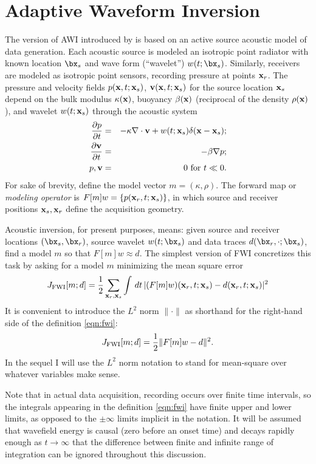 \section{Adaptive Waveform Inversion}

The version of AWI introduced by \cite{Warner:16} is based on an
active source acoustic model of data generation. Each acoustic source
is modeled an isotropic point radiator with known location $\bx_s$ and
wave form (``wavelet'') $w(t;\bx_s)$. Similarly, receivers are modeled
as isotropic point sensors, recording pressure at points ${\bf x}_r$. The pressure and velocity fields $p({\bf x},t;{\bf x}_s)$, ${\bf v}({\bf x},t;{\bf x}_s)$ for the source location ${\bf x}_s$ depend on the bulk modulus $\kappa({\bf x})$, buoyancy $\beta({\bf x})$ (reciprocal of the density $\rho({\bf x})$), and wavelet $w(t;{\bf x}_s)$ through the acoustic system
\begin{eqnarray}
  \label{eqn:awe}
 \frac{\partial p}{\partial t} & = &- \kappa \nabla \cdot {\bf v} +
w(t;{\bf x}_s) \delta({\bf x}-{\bf x}_s); \nonumber \\
\frac{\partial {\bf v}}{\partial t} & = & - \beta \nabla p; \\ 
p, {\bf v} & = & 0 \mbox{ for }  t \ll 0.
\end{eqnarray}
For sake of brevity, define the model vector $m=(\kappa,\rho)$. The forward map or {\em modeling operator} is $F[m]w = \{p({\bf x}_r,t;{\bf x}_s)\}$, in which source and receiver positions ${\bf x}_s, {\bf x}_r$ define the acquisition geometry.

Acoustic inversion, for present purposes, means: given source and receiver locations $(\bx_s,\bx_r)$, source wavelet
$w(t;\bx_s)$ and data traces $d(\bx_r,\cdot;\bx_s)$, find a model $m$
so that $F[m]w \approx d$. The
simplest version of FWI concretizes this task by asking for a model
$m$ minimizing the mean square error
\begin{equation}
  \label{eqn:fwi}
  J_{\rm FWI}[m;d] =\frac{1}{2} \sum_{{\bf x}_r,{\bf x}_s} \int\,dt\, |(F[m]w)({\bf x}_r,t;{\bf x}_s) - d({\bf x}_r,t;{\bf x}_s)|^2
\end{equation}
It is convenient to introduce the $L^2$ norm $\| \cdot \|$ as
shorthand for the right-hand side of the definition \ref{eqn:fwi}:
\[
  J_{\rm FWI}[m;d]= \frac{1}{2}\|F[m]w-d\|^2.
\]
In the sequel I will use the $L^2$ norm notation to stand for
mean-square over whatever variables make sense.

Note that in actual data acquisition, recording occurs over finite
time intervals, so the integrals appearing in the definition
\ref{eqn:fwi} have finite upper and lower limits, as opposed to the
$\pm \infty$ limits implicit in the notation. It will be assumed that
wavefield energy is causal (zero before an onset time) and decays
rapidly enough as $t \rightarrow \infty$ that the difference between
finite and infinite range of integration can be ignored throughout
this discussion.


